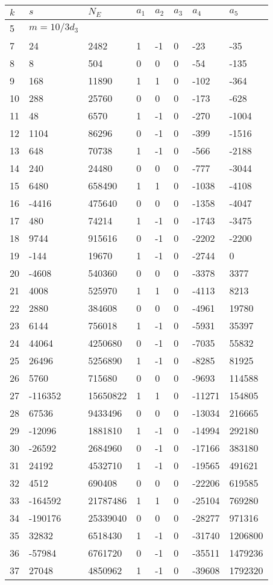 \documentclass{amsart}
\begin{document}
\begin{longtable}{|l|l|l|lllll|}
\hline
$k$ & $s$ & $N_E$ & $a_1$ & $a_2$ & $a_3$ & $a_4$ & $a_5$\\
\hline
5&$m=10/3d_{3}$&&\multicolumn{5}{c|}{}\\
7&24&2482&1&-1&0&-23&-35\\
8&8&504&0&0&0&-54&-135\\
9&168&11890&1&1&0&-102&-364\\
10&288&25760&0&0&0&-173&-628\\
11&48&6570&1&-1&0&-270&-1004\\
12&1104&86296&0&-1&0&-399&-1516\\
13&648&70738&1&-1&0&-566&-2188\\
14&240&24480&0&0&0&-777&-3044\\
15&6480&658490&1&1&0&-1038&-4108\\
16&-4416&475640&0&0&0&-1358&-4047\\
17&480&74214&1&-1&0&-1743&-3475\\
18&9744&915616&0&-1&0&-2202&-2200\\
19&-144&19670&1&-1&0&-2744&0\\
20&-4608&540360&0&0&0&-3378&3377\\
21&4008&525970&1&1&0&-4113&8213\\
22&2880&384608&0&0&0&-4961&19780\\
23&6144&756018&1&-1&0&-5931&35397\\
24&44064&4250680&0&-1&0&-7035&55832\\
25&26496&5256890&1&-1&0&-8285&81925\\
26&5760&715680&0&0&0&-9693&114588\\
27&-116352&15650822&1&1&0&-11271&154805\\
28&67536&9433496&0&0&0&-13034&216665\\
29&-12096&1881810&1&-1&0&-14994&292180\\
30&-26592&2684960&0&-1&0&-17166&383180\\
31&24192&4532710&1&-1&0&-19565&491621\\
32&4512&690408&0&0&0&-22206&619585\\
33&-164592&21787486&1&1&0&-25104&769280\\
34&-190176&25339040&0&0&0&-28277&971316\\
35&32832&6518430&1&-1&0&-31740&1206800\\
36&-57984&6761720&0&-1&0&-35511&1479236\\
37&27048&4850962&1&-1&0&-39608&1792320\\

\end{longtable}
\end{document}
